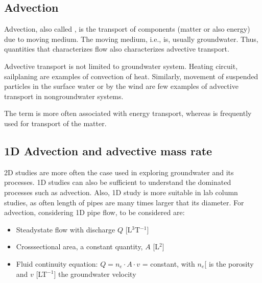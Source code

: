 \documentclass[letterpaper,10pt,english]{jupyterBook}
\begin{document}
\subsection{Advection}
\label{\detokenize{content/transport/L9/21_conservative_transport:advection}}
\sphinxAtStartPar
Advection, also called , is the transport of components (matter or also energy) due to moving medium. The moving medium, i.e.,  is, usually groundwater. Thus, quantities that characterizes flow also characterizes advective transport.

\sphinxAtStartPar
Advective transport is not limited to groundwater system. Heating circuit, sailplaning are examples of convection of heat. Similarly, movement of suspended particles in the surface water or by the wind are few examples of advective transport in non\sphinxhyphen{}groundwater systems.

\sphinxAtStartPar
The term  is more often associated with energy transport, whereas  is frequently used for transport of the matter.


\subsection{1D Advection and advective mass rate}
\label{\detokenize{content/transport/L9/21_conservative_transport:d-advection-and-advective-mass-rate}}
\sphinxAtStartPar
2D studies are more often the case used in exploring groundwater and its processes. 1D studies can also be sufficient to understand the  dominated processes such as advection. Also, 1D study is more suitable in lab column studies, as often length of pipes are many times larger that its diameter. For advection, considering 1D pipe flow, to be considered are:
\begin{itemize}
\item {} 
\sphinxAtStartPar
Steady\sphinxhyphen{}state flow with discharge \(Q\) {[}L\(^3\)T\(^{-1}\){]}

\item {} 
\sphinxAtStartPar
Cross\sphinxhyphen{}sectional area, a constant quantity,  \(A\) {[}L\(^2\){]}

\item {} 
\sphinxAtStartPar
Fluid continuity equation: \(Q= n_e\cdot A\cdot v\) = constant, with \(n_e\){[}\sphinxhyphen{}{]} is the  porosity and \(v\) {[}LT\(^{-1}\){]} the  groundwater velocity

\end{itemize}
\end{document}
